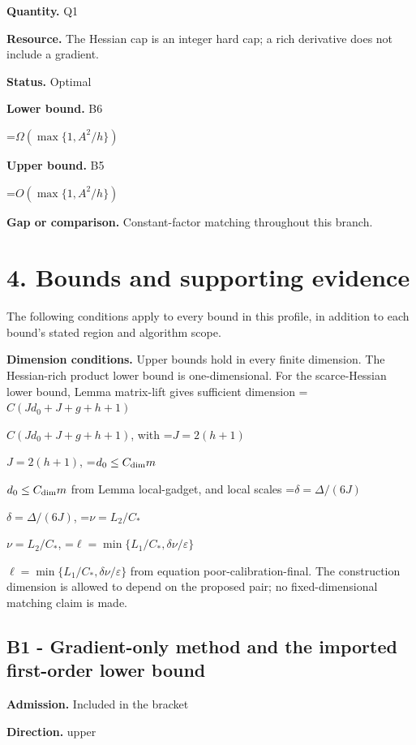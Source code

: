 \documentclass[10pt,a4paper]{article}
\newcommand{\AtlasMath}[1]{\par\begingroup\centering\setbox0=\hbox{$\displaystyle #1$}\ifdim\wd0>1.4\linewidth\typeout{ATLAS WIDE FORMULA: \the\wd0}\fi\ifdim\wd0>\linewidth\resizebox{\linewidth}{!}{\box0}\else\box0\fi\par\endgroup}
\newcommand{\AtlasInlineMath}[1]{\begingroup\setbox0=\hbox{$#1$}\ifdim\wd0>.4\linewidth\endgroup\AtlasMath{#1}\else\endgroup$#1$\fi}
\begin{document}
\textbf{Quantity.} Q1



\textbf{Resource.} The Hessian cap is an integer hard cap; a rich derivative does not include a gradient.



\textbf{Status.} Optimal



\textbf{Lower bound.} B6



\AtlasMath{\Omega\!\left(\max\{1,A^2/h\}\right)}


\textbf{Upper bound.} B5



\AtlasMath{O\!\left(\max\{1,A^2/h\}\right)}


\textbf{Gap or comparison.} Constant-factor matching throughout this branch.



\section{4. Bounds and supporting evidence}


The following conditions apply to every bound in this profile, in addition to each bound's stated region and algorithm scope.



\textbf{Dimension conditions.} Upper bounds hold in every finite dimension. The Hessian-rich product lower bound is one-dimensional. For the scarce-Hessian lower bound, Lemma matrix-lift gives sufficient dimension \AtlasInlineMath{C(Jd_0+J+g+h+1)}, with \AtlasInlineMath{J=2(h+1)}, \AtlasInlineMath{d_0\le C_{\rm dim}m} from Lemma local-gadget, and local scales \AtlasInlineMath{\delta=\Delta/(6J)}, \AtlasInlineMath{\nu=L_2/C_*}, \AtlasInlineMath{\ell=\min\{L_1/C_*,\delta\nu/\varepsilon\}} from equation poor-calibration-final. The construction dimension is allowed to depend on the proposed pair; no fixed-dimensional matching claim is made.



\subsection{B1 - Gradient-only method and the imported first-order lower bound}


\textbf{Admission.} Included in the bracket



\textbf{Direction.} upper
\end{document}
